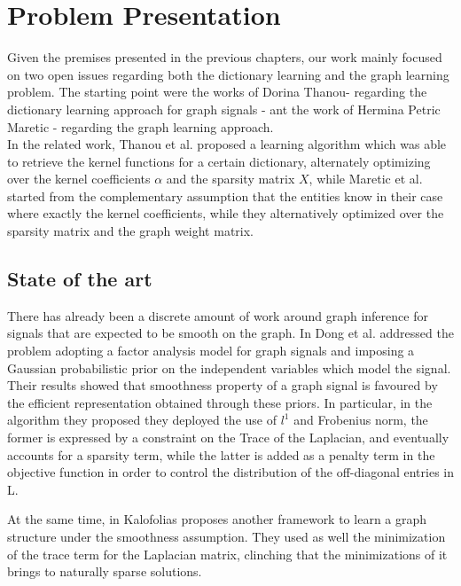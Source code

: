 \chapter{Problem Presentation}
Given the premises presented in the previous chapters, our work mainly focused on two open issues regarding both the dictionary learning and the graph learning problem. The starting point were the works of Dorina Thanou-  regarding the dictionary learning approach for graph signals - ant the work of Hermina Petric Maretic - regarding the graph learning approach.\\
In the related work, Thanou et al. proposed a learning algorithm which was able to retrieve the kernel functions for a certain dictionary, alternately optimizing over the kernel coefficients $\alpha$ and the sparsity matrix $X$, while Maretic et al. started from the complementary assumption that the entities know in their case where exactly the kernel coefficients, while they alternatively optimized over the sparsity matrix and the graph weight matrix.

\section{State of the art}
There has already been a discrete amount of work around graph inference for signals that are expected to be smooth on the graph.  In \cite{Dong2016} Dong et al. addressed the problem adopting a factor analysis model for graph signals and imposing a Gaussian probabilistic prior on the independent variables which model the signal. Their results showed that smoothness property of a graph signal is favoured by the efficient representation obtained through these priors. In particular, in the algorithm they proposed they deployed the use of $l^1$ and Frobenius norm, the former is expressed by a constraint on the Trace of the Laplacian, and eventually accounts for a sparsity term, while the latter is added as a penalty term in the objective function in order to control the distribution of the off-diagonal entries in L.

At the same time, in \cite{Kalofolias2016} Kalofolias proposes another framework to learn a graph structure under the smoothness assumption. They used as well the minimization of the trace term for the Laplacian matrix, clinching that the minimizations of it brings to naturally sparse solutions.

